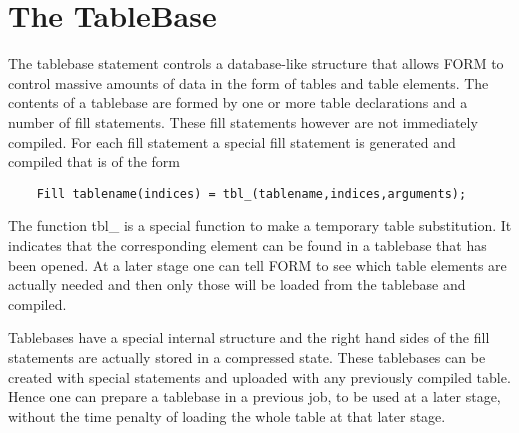 
\chapter{The TableBase}
\label{tablebase}

The tablebase statement controls a 
database-like structure that allows FORM to control massive 
amounts of data in the form of tables and
table elements.
The contents of a tablebase are formed by one or more table declarations 
and a number of fill statements. These fill statements however 
are not immediately compiled. For each fill statement a special fill 
statement is generated and compiled that is of the form
\begin{verbatim}
    Fill tablename(indices) = tbl_(tablename,indices,arguments);
\end{verbatim}
The function tbl\_ is a special function to make a temporary 
table substitution. It indicates that the corresponding element can be 
found in a tablebase that has been opened. At a later stage one can tell 
FORM to see which table elements are actually needed and then only those 
will be loaded from the tablebase and compiled.

Tablebases have a special internal structure and the right hand sides of 
the fill statements are actually stored in a compressed 
state. These tablebases can be created with special statements and uploaded 
with any previously compiled table. Hence one can prepare a tablebase in a 
previous job, to be used at a later stage, without the time penalty of 
loading the whole table at that later stage.

